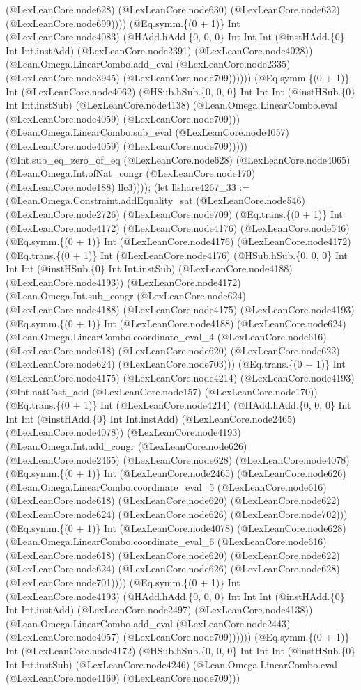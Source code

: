 \documentclass[11pt]{article}
\begin{document}
(@LexLeanCore.node628) (@LexLeanCore.node630) (@LexLeanCore.node632) (@LexLeanCore.node699)))) (@Eq.symm.\{(0 + 1)\} Int (@LexLeanCore.node4083) (@HAdd.hAdd.\{0, 0, 0\} Int Int Int (@instHAdd.\{0\} Int Int.instAdd) (@LexLeanCore.node2391) (@LexLeanCore.node4028)) (@Lean.Omega.LinearCombo.add\_eval (@LexLeanCore.node2335) (@LexLeanCore.node3945) (@LexLeanCore.node709)))))) (@Eq.symm.\{(0 + 1)\} Int (@LexLeanCore.node4062) (@HSub.hSub.\{0, 0, 0\} Int Int Int (@instHSub.\{0\} Int Int.instSub) (@LexLeanCore.node4138) (@Lean.Omega.LinearCombo.eval (@LexLeanCore.node4059) (@LexLeanCore.node709))) (@Lean.Omega.LinearCombo.sub\_eval (@LexLeanCore.node4057) (@LexLeanCore.node4059) (@LexLeanCore.node709))))) (@Int.sub\_eq\_zero\_of\_eq (@LexLeanCore.node628) (@LexLeanCore.node4065) (@Lean.Omega.Int.ofNat\_congr (@LexLeanCore.node170) (@LexLeanCore.node188) llc3)))); (let llshare4267\_33 := (@Lean.Omega.Constraint.addEquality\_sat (@LexLeanCore.node546) (@LexLeanCore.node2726) (@LexLeanCore.node709) (@Eq.trans.\{(0 + 1)\} Int (@LexLeanCore.node4172) (@LexLeanCore.node4176) (@LexLeanCore.node546) (@Eq.symm.\{(0 + 1)\} Int (@LexLeanCore.node4176) (@LexLeanCore.node4172) (@Eq.trans.\{(0 + 1)\} Int (@LexLeanCore.node4176) (@HSub.hSub.\{0, 0, 0\} Int Int Int (@instHSub.\{0\} Int Int.instSub) (@LexLeanCore.node4188) (@LexLeanCore.node4193)) (@LexLeanCore.node4172) (@Lean.Omega.Int.sub\_congr (@LexLeanCore.node624) (@LexLeanCore.node4188) (@LexLeanCore.node4175) (@LexLeanCore.node4193) (@Eq.symm.\{(0 + 1)\} Int (@LexLeanCore.node4188) (@LexLeanCore.node624) (@Lean.Omega.LinearCombo.coordinate\_eval\_4 (@LexLeanCore.node616) (@LexLeanCore.node618) (@LexLeanCore.node620) (@LexLeanCore.node622) (@LexLeanCore.node624) (@LexLeanCore.node703))) (@Eq.trans.\{(0 + 1)\} Int (@LexLeanCore.node4175) (@LexLeanCore.node4214) (@LexLeanCore.node4193) (@Int.natCast\_add (@LexLeanCore.node157) (@LexLeanCore.node170)) (@Eq.trans.\{(0 + 1)\} Int (@LexLeanCore.node4214) (@HAdd.hAdd.\{0, 0, 0\} Int Int Int (@instHAdd.\{0\} Int Int.instAdd) (@LexLeanCore.node2465) (@LexLeanCore.node4078)) (@LexLeanCore.node4193) (@Lean.Omega.Int.add\_congr (@LexLeanCore.node626) (@LexLeanCore.node2465) (@LexLeanCore.node628) (@LexLeanCore.node4078) (@Eq.symm.\{(0 + 1)\} Int (@LexLeanCore.node2465) (@LexLeanCore.node626) (@Lean.Omega.LinearCombo.coordinate\_eval\_5 (@LexLeanCore.node616) (@LexLeanCore.node618) (@LexLeanCore.node620) (@LexLeanCore.node622) (@LexLeanCore.node624) (@LexLeanCore.node626) (@LexLeanCore.node702))) (@Eq.symm.\{(0 + 1)\} Int (@LexLeanCore.node4078) (@LexLeanCore.node628) (@Lean.Omega.LinearCombo.coordinate\_eval\_6 (@LexLeanCore.node616) (@LexLeanCore.node618) (@LexLeanCore.node620) (@LexLeanCore.node622) (@LexLeanCore.node624) (@LexLeanCore.node626) (@LexLeanCore.node628) (@LexLeanCore.node701)))) (@Eq.symm.\{(0 + 1)\} Int (@LexLeanCore.node4193) (@HAdd.hAdd.\{0, 0, 0\} Int Int Int (@instHAdd.\{0\} Int Int.instAdd) (@LexLeanCore.node2497) (@LexLeanCore.node4138)) (@Lean.Omega.LinearCombo.add\_eval (@LexLeanCore.node2443) (@LexLeanCore.node4057) (@LexLeanCore.node709)))))) (@Eq.symm.\{(0 + 1)\} Int (@LexLeanCore.node4172) (@HSub.hSub.\{0, 0, 0\} Int Int Int (@instHSub.\{0\} Int Int.instSub) (@LexLeanCore.node4246) (@Lean.Omega.LinearCombo.eval (@LexLeanCore.node4169) (@LexLeanCore.node709))) 
\end{document}
